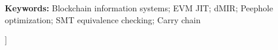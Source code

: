 \documentclass[10pt,a4paper,twocolumn]{article}
\begin{document}
\begin{@twocolumnfalse}
\begin{center}
{\noindent\textbf{Keywords: }Blockchain information systems; EVM JIT; dMIR; Peephole optimization; SMT equivalence checking; Carry chain
}
\end{center}
\vspace{1.0em}
\end{@twocolumnfalse}
]
\end{document}
